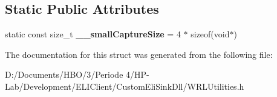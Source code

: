 \subsection*{Static Public Attributes}
\begin{DoxyCompactItemize}
\item 
\mbox{\label{struct____abi___capture_base_aafdb896af6a45070c551f744fd572038}} 
static const size\+\_\+t {\bfseries \+\_\+\+\_\+small\+Capture\+Size} = 4 $\ast$ sizeof(void$\ast$)
\end{DoxyCompactItemize}


The documentation for this struct was generated from the following file\+:\begin{DoxyCompactItemize}
\item 
D\+:/\+Documents/\+H\+B\+O/3/\+Periode 4/\+H\+P-\/\+Lab/\+Development/\+E\+L\+I\+Client/\+Custom\+Eli\+Sink\+Dll/W\+R\+L\+Utilities.\+h\end{DoxyCompactItemize}
